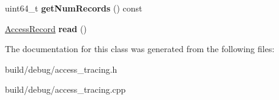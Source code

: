 \begin{DoxyCompactItemize}
\item 
\hypertarget{classAccessTraceReader_a615bdd807251b7177d5112caefb04ba0}{uint64\-\_\-t {\bfseries get\-Num\-Records} () const }\label{classAccessTraceReader_a615bdd807251b7177d5112caefb04ba0}

\item 
\hypertarget{classAccessTraceReader_a344dae9e9818665d382681daae002f1e}{\hyperlink{structAccessRecord}{Access\-Record} {\bfseries read} ()}\label{classAccessTraceReader_a344dae9e9818665d382681daae002f1e}

\end{DoxyCompactItemize}


The documentation for this class was generated from the following files\-:\begin{DoxyCompactItemize}
\item 
build/debug/access\-\_\-tracing.\-h\item 
build/debug/access\-\_\-tracing.\-cpp\end{DoxyCompactItemize}
